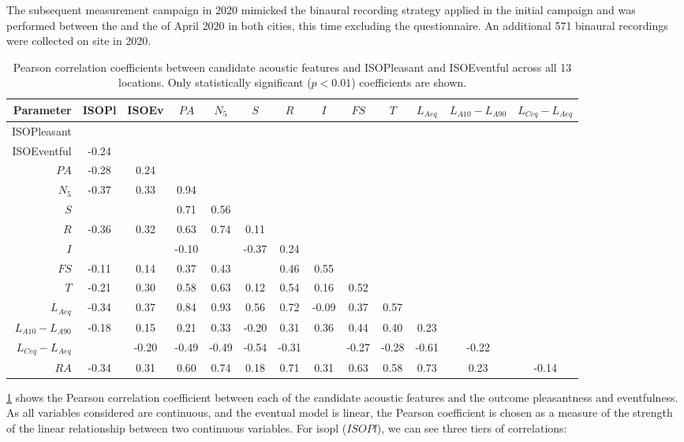    The subsequent measurement campaign in 2020 mimicked the binaural recording strategy applied in the initial campaign and was performed between the  and the  of April 2020 in both cities, this time excluding the questionnaire. An additional 571 binaural recordings were collected on site in 2020. 


\begin{table}
\centering
\caption{Pearson correlation coefficients between candidate acoustic features and ISOPleasant and ISOEventful across all 13 locations. Only statistically significant ($p < 0.01$) coefficients are shown. \label{tab:corr}}
\begin{tabular}{r|cccccccccccc} 
\toprule
\textbf{Parameter} & ISOPl & ISOEv & $PA$ & $N_5$ & $S$ & $R$ & $I$ & $FS$ & $T$ & $L_{Aeq}$ & $L_{A10}-L_{A90}$ & $L_{Ceq}-L_{Aeq}$ \\ 
\midrule
ISOPleasant &  &  &  &  &  &  &  &  &  &  &  &  \\
ISOEventful & -0.24 &  &  &  &  &  &  &  &  &  &  &  \\
$PA$ & -0.28 & 0.24 &  &  &  &  &  &  &  &  &  &  \\
$N_5$ & -0.37 & 0.33 & 0.94 &  &  &  &  &  &  &  &  &  \\
$S$ &  &  & 0.71 & 0.56 &  &  &  &  &  &  &  &  \\
$R$ & -0.36 & 0.32 & 0.63 & 0.74 & 0.11 &  &  &  &  &  &  &  \\
$I$ &  &  & -0.10 &  & -0.37 & 0.24 &  &  &  &  &  &  \\
$FS$ & -0.11 & 0.14 & 0.37 & 0.43 &  & 0.46 & 0.55 &  &  &  &  &  \\
$T$ & -0.21 & 0.30 & 0.58 & 0.63 & 0.12 & 0.54 & 0.16 & 0.52 &  &  &  &  \\
$L_{Aeq}$ & -0.34 & 0.37 & 0.84 & 0.93 & 0.56 & 0.72 & -0.09 & 0.37 & 0.57 &  &  &  \\
$L_{A10}-L_{A90}$ & -0.18 & 0.15 & 0.21 & 0.33 & -0.20 & 0.31 & 0.36 & 0.44 & 0.40 & 0.23 &  &  \\
$L_{Ceq}-L_{Aeq}$ &  & -0.20 & -0.49 & -0.49 & -0.54 & -0.31 &  & -0.27 & -0.28 & -0.61 & -0.22 &  \\
$RA$ & -0.34 & 0.31 & 0.60 & 0.74 & 0.18 & 0.71 & 0.31 & 0.63 & 0.58 & 0.73 & 0.23 & -0.14 \\
\bottomrule
\end{tabular}
\end{table}

   \cref{tab:corr} shows the Pearson correlation coefficient between each of the candidate acoustic features and the outcome pleasantness and eventfulness. As all variables considered are continuous, and the eventual model is linear, the Pearson coefficient is chosen as a measure of the strength of the linear relationship between two continuous variables. For \gls{isopl} ($ISOPl$), we can see three tiers of correlations:

